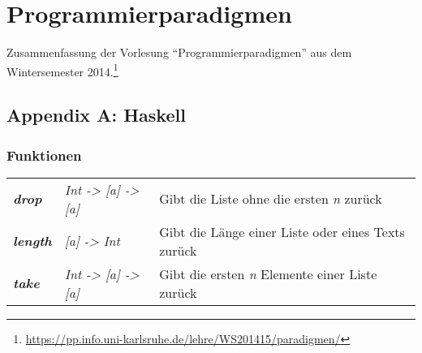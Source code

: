 \chapter{Programmierparadigmen}

Zusammenfassung der Vorlesung "`Programmierparadigmen"' aus dem Wintersemester 2014.\footnote{\url{https://pp.info.uni-karlsruhe.de/lehre/WS201415/paradigmen/}}

\section{Appendix A: Haskell}

\subsection{Funktionen}

\begin{table}[h]
\begin{tabularx}{\textwidth}{l|X|X}
	\textbf{\textit{drop}} & \textit{Int -> [a] -> [a]} & Gibt die Liste ohne die ersten \textit{n} zurück\\
	\textbf{\textit{length}} & \textit{[a] -> Int} & Gibt die Länge einer Liste oder eines Texts zurück \\
	\textbf{\textit{take}} & \textit{Int -> [a] -> [a]} & Gibt die ersten \textit{n} Elemente einer Liste zurück\\
\end{tabularx}
\end{table}